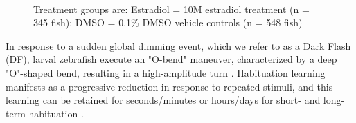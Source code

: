 \documentclass[9pt,lineno]{RandlettLab_elife}
\begin{document}
\begin{figure}
\begin{fullwidth}
\begin{center}
{\\ Treatment groups are: Estradiol = 10\textmu M estradiol treatment (n = 345 fish); DMSO = 0.1\% DMSO vehicle controls (n = 548 fish)
}

\label{fig:1}

\end{center}
\end{fullwidth}
\end{figure}


In response to a sudden global dimming event, which we refer to as a Dark Flash (DF), larval zebrafish execute an "O-bend" maneuver, characterized by a deep "O"-shaped bend, resulting in a high-amplitude turn \citep{Burgess2007}. 
Habituation learning manifests as a progressive reduction in response to repeated stimuli, and this learning can be retained for seconds/minutes or hours/days for short- and long-term habituation \citep{Rankin2009-no}. 
\end{document}
